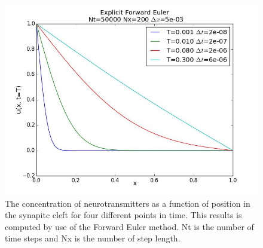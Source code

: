 \documentclass[12pt]{article}
\begin{document}
\begin{flushleft}
\begin{figure}[!h]
\begin{center}
\includegraphics[scale=0.4]{EF_Nt5000_Nx200}
\caption{\label{fig:forward_Euler_u}The concentration of neurotransmitters as a function of position in the synapitc cleft for four different points in time. This results is computed by use of the Forward Euler method. Nt is the number of time steps and Nx is the number of step length.}
\end{center}
\end{figure}


\end{flushleft}
\end{document}
